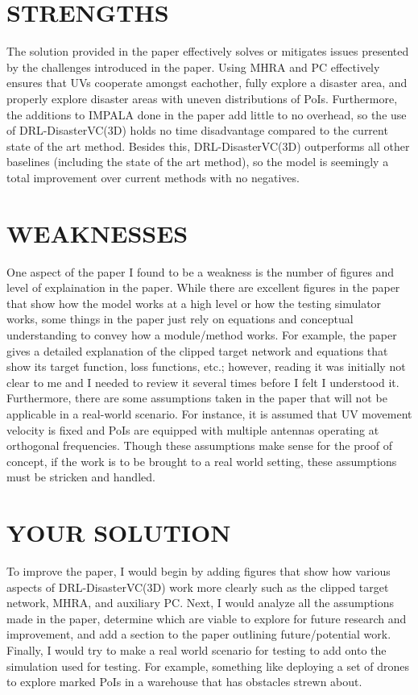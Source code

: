 \documentclass[sigconf, natbib=false]{acmart}
\begin{document}
   \section{STRENGTHS}
   The solution provided in the paper effectively solves or mitigates issues presented by the challenges introduced in the paper. Using MHRA and PC effectively ensures that UVs cooperate amongst eachother, fully explore a disaster area, and properly explore disaster areas with uneven distributions of PoIs. Furthermore, the additions to IMPALA done in the paper add little to no overhead, so the use of DRL-DisasterVC(3D) holds no time disadvantage compared to the current state of the art method. Besides this, DRL-DisasterVC(3D) outperforms all other baselines (including the state of the art method), so the model is seemingly a total improvement over current methods with no negatives.
   
   \section{WEAKNESSES}
   One aspect of the paper I found to be a weakness is the number of figures and level of explaination in the paper. While there are excellent figures in the paper that show how the model works at a high level or how the testing simulator works, some things in the paper just rely on equations and conceptual understanding to convey how a module/method works. For example, the paper gives a detailed explanation of the clipped target network and equations that show its target function, loss functions, etc.; however, reading it was initially not clear to me and I needed to review it several times before I felt I understood it. Furthermore, there are some assumptions taken in the paper that will not be applicable in a real-world scenario. For instance, it is assumed that UV movement velocity is fixed and PoIs are equipped with multiple antennas operating at orthogonal frequencies. Though these assumptions make sense for the proof of concept, if the work is to be brought to a real world setting, these assumptions must be stricken and handled.
   
   \section{YOUR SOLUTION}
   To improve the paper, I would begin by adding figures that show how various aspects of DRL-DisasterVC(3D) work more clearly such as the clipped target network, MHRA, and auxiliary PC. Next, I would analyze all the assumptions made in the paper, determine which are viable to explore for future research and improvement, and add a section to the paper outlining future/potential work. Finally, I would try to make a real world scenario for testing to add onto the simulation used for testing. For example, something like deploying a set of drones to explore marked PoIs in a warehouse that has obstacles strewn about.
\end{document}
